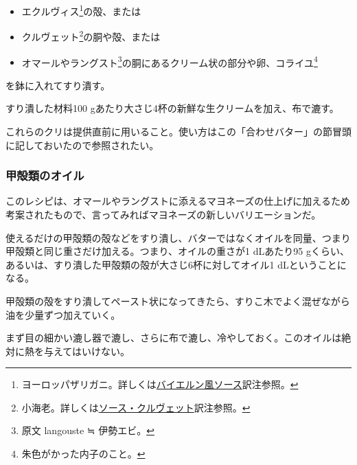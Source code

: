 \begin{recette}

 

\begin{itemize}
\item
  エクルヴィス\footnote{ヨーロッパザリガニ。詳しくは\protect\hyperlink{sauce-bavaroise}{バイエルン風ソース}訳注参照。}の殻、または
\item
  クルヴェット\footnote{小海老。詳しくは\protect\hyperlink{sauce-aux-crevettes}{ソース・クルヴェット}訳注参照。}の胴や殻、または
\item
  オマールやラングスト\footnote{原文 langouste ≒ 伊勢エビ。}の胴にあるクリーム状の部分や卵、コライユ\footnote{朱色がかった内子のこと。}
\end{itemize}

を鉢に入れてすり潰す。

すり潰した材料100 gあたり大さじ4杯の新鮮な生クリームを加え、布で漉す。

これらのクリは提供直前に用いること。使い方はこの「合わせバター」の節冒頭に記しておいたので参照されたい。

\hypertarget{huile-de-crustaces}{%
\subsubsection{甲殻類のオイル}\label{huile-de-crustaces}}



このレシピは、オマールやラングストに添えるマヨネーズの仕上げに加えるため考案されたもので、言ってみればマヨネーズの新しいバリエーションだ。

使えるだけの甲殻類の殻などをすり潰し、バターではなくオイルを同量、つまり甲殻類と同じ重さだけ加える。つまり、オイルの重さが1
dLあたり95
gくらい、あるいは、すり潰した甲殻類の殻が大さじ6杯に対してオイル1
dLということになる。

甲殻類の殻をすり潰してペースト状になってきたら、すりこ木でよく混ぜながら油を少量ずつ加えていく。

まず目の細かい漉し器で漉し、さらに布で漉し、冷やしておく。このオイルは絶対に熱を与えてはいけない。
\end{recette}